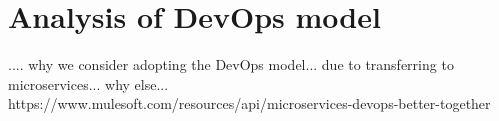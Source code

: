 \chapter{Analysis of DevOps model}.... why we consider adopting the DevOps model... due to transferring to microservices... why else... https://www.mulesoft.com/resources/api/microservices-devops-better-together












% 


